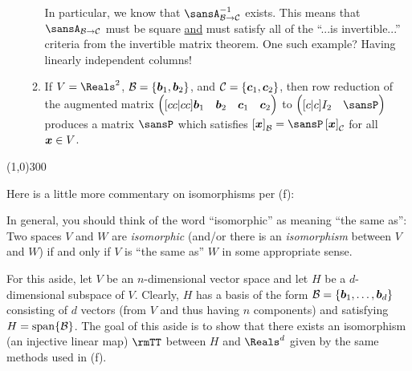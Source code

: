 \documentclass[12pt]{article}
\begin{document}
\begin{enumerate}[leftmargin=0mm]
\begin{enumerate}[label=(\alph*),itemsep=3mm,parsep=3mm]
{			In particular, we know that $\sansA_{\calB\to\calC}^{-1}$ exists. This means that $\sansA_{\calB\to\calC}$ must be square \ul{and} must satisfy all of the ``...is invertible...'' criteria from the invertible matrix theorem. One such example? Having linearly independent columns!}
			
			\item If $V=\Reals^2$, $\mathcal{B}=\{\boldsymbol{b}_1,\boldsymbol{b}_2\}$, and $\mathcal{C}=\{\boldsymbol{c}_1,\boldsymbol{c}_2\}$, then row reduction of the augmented matrix $\pmatgrid{cc|cc}{\vect{b}_1 & \vect{b}_2 & \vect{c}_1 & \vect{c}_2}$ to $\pmatgrid{c | c}{I_2 & \sansP}$ produces a matrix $\sansP$ which satisfies $\left[\vect{x}\right]_\calB=\sansP\left[\vect{x}\right]_\calC$ for all $\boldsymbol{x}\in V$.
			
		\end{enumerate}
	\end{enumerate}
	
	\vspace{-3mm}
	\begin{center}
		\line(1,0){300}
	\end{center}
	\vspace{0mm}
	
	\setlength{\parskip}{3mm}
		
	Here is a little more commentary on isomorphisms per (f):
	
	In general, you should think of the word ``isomorphic'' as meaning ``the same as'': Two spaces $V$ and $W$ are \textit{isomorphic} (and/or there is an \textit{isomorphism} between $V$ and $W$) if and only if $V$ is ``the same as'' $W$ in some appropriate sense. 
	
	
	For this aside, let $V$ be an $n$-dimensional vector space and let $H$ be a $d$-dimensional subspace of $V$. Clearly, $H$ has a basis of the form $\mathcal{B}=\{\boldsymbol{b}_1,\ldots,\boldsymbol{b}_d\}$ consisting of $d$ vectors (from $V$ and thus having $n$ components) and satisfying $H=\operatorname{span}\{\mathcal{B}\}$. The goal of this aside is to show that there exists an isomorphism (an injective linear map) $\rmTT$ between $H$ and $\Reals^d$ given by the same methods used in (f).
	
\end{document}
